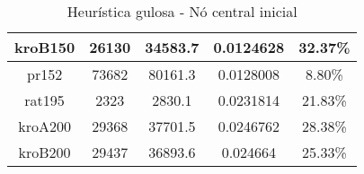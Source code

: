 \begin{table}[H]
\begin{tabular}{|c|c|c|c|c|}
        kroB150           & 26130          & 34583.7        & 0.0124628        & 32.37\%        \\ \hline
        pr152             & 73682          & 80161.3        & 0.0128008        & 8.80\%         \\ \hline
        rat195            & 2323           & 2830.1         & 0.0231814        & 21.83\%        \\ \hline
        kroA200           & 29368          & 37701.5        & 0.0246762        & 28.38\%        \\ \hline
        kroB200           & 29437          & 36893.6        & 0.024664         & 25.33\%        \\ \hline
    \end{tabular}
    \caption{Heurística gulosa - Nó central inicial}
    \label{tab:my_label}
\end{table}

